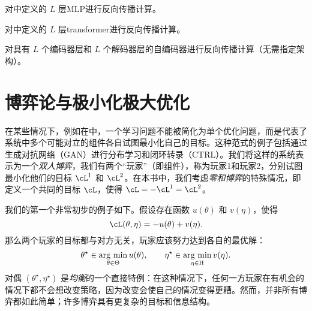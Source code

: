 \documentclass[../../book-main.tex]{subfiles}
\begin{document}
\begin{exercise}
    对中定义的 \(L\) 层MLP进行反向传播计算。
\end{exercise}

\begin{exercise}
    对中定义的 \(L\) 层transformer进行反向传播计算。
\end{exercise}

\begin{exercise}
    对具有 \(L\) 个编码器层和 \(L\) 个解码器层的自编码器进行反向传播计算（无需指定架构）。
\end{exercise}


\section{博弈论与极小化极大优化} \label{sec:minimax}\label{sec:game_theory}

在某些情况下，例如在中，一个学习问题不能被简化为单个优化问题，而是代表了系统中多个可能对立的组件各自试图最小化自己的目标。这种范式的例子包括通过生成对抗网络（GAN）进行分布学习和闭环转录（CTRL）。我们将这样的系统表示为一个\textit{双人博弈}，我们有两个“玩家”（即组件），称为玩家1和玩家2，分别试图最小化他们的目标 \(\cL^{1}\) 和 \(\cL^{2}\)。在本书中，我们考虑\textit{零和博弈}的特殊情况，即定义一个共同的目标 \(\cL\)，使得 \(\cL = -\cL^{1} = \cL^{2}\)。

我们的第一个非常初步的例子如下。假设存在函数 \(u(\theta)\) 和 \(v(\eta)\)，使得
\begin{equation}
    \cL(\theta, \eta) = -u(\theta) + v(\eta).
\end{equation}
那么两个玩家的目标都与对方无关，玩家应该努力达到各自的最优解：
\begin{equation}
    \theta^{\star} \in \operatorname*{arg\ min}_{\theta \in \Theta}u(\theta), \qquad \eta^{\star} \in \operatorname*{arg\ min}_{\eta \in \mathrm{H}}v(\eta).
\end{equation}
对偶 \((\theta^{\star}, \eta^{\star})\) 是\textit{均衡}的一个直接特例：在这种情况下，任何一方玩家在有机会的情况下都不会想改变策略，因为改变会使自己的情况变得更糟。然而，并非所有博弈都如此简单；许多博弈具有更复杂的目标和信息结构。
\end{document}
